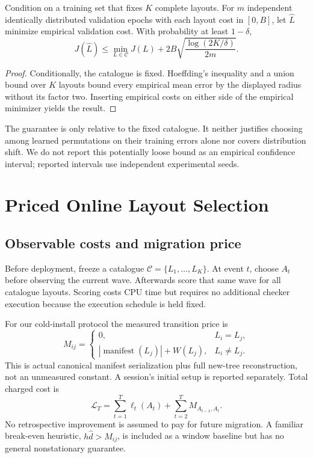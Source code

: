 \documentclass[11pt]{article}
\theoremstyle{definition}\newtheorem{definition}[theorem]{Definition}
\begin{document}
\begin{proposition}\label{prop:validation}
Condition on a training set that fixes $K$ complete layouts. For $m$ independent identically distributed validation epochs with each layout cost in $[0,B]$, let $\widehat L$ minimize empirical validation cost. With probability at least $1-\delta$,
\begin{equation}
 J(\widehat L)\le\min_{L\in\mathcal C}J(L)+2B\sqrt{\frac{\log(2K/\delta)}{2m}}.
\end{equation}
\end{proposition}
\begin{proof}
Conditionally, the catalogue is fixed. Hoeffding's inequality and a union bound over $K$ layouts bound every empirical mean error by the displayed radius without its factor two. Inserting empirical costs on either side of the empirical minimizer yields the result.\end{proof}
The guarantee is only relative to the fixed catalogue. It neither justifies choosing among learned permutations on their training errors alone nor covers distribution shift. We do not report this potentially loose bound as an empirical confidence interval; reported intervals use independent experimental seeds.

\section{Priced Online Layout Selection}\label{sec:online}
\subsection{Observable costs and migration price}
Before deployment, freeze a catalogue $\mathcal C=\{L_1,\ldots,L_K\}$. At event $t$, choose $A_t$ before observing the current wave. Afterwards score that same wave for all catalogue layouts. Scoring costs CPU time but requires no additional checker execution because the execution schedule is held fixed.

For our cold-install protocol the measured transition price is
\begin{equation}\label{eq:migration}
 M_{ij}=\begin{cases}0,&L_i=L_j,\\
 |\operatorname{manifest}(L_j)|+W(L_j),&L_i\ne L_j.
 \end{cases}
\end{equation}
This is actual canonical manifest serialization plus full new-tree reconstruction, not an unmeasured constant. A session's initial setup is reported separately. Total charged cost is
\begin{equation}
 \mathcal L_T=\sum_{t=1}^T\ell_t(A_t)+\sum_{t=2}^TM_{A_{t-1},A_t}.
\end{equation}
No retrospective improvement is assumed to pay for future migration. A familiar break-even heuristic, $h\widehat d>M_{ij}$, is included as a window baseline but has no general nonstationary guarantee.
\end{document}
